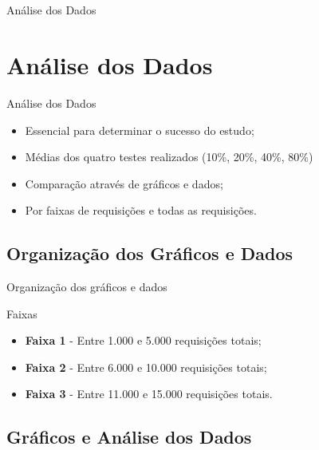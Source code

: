 \section*{}
\begin{frame}
	\centering
	{\Huge Análise dos Dados}
\end{frame}

\section{Análise dos Dados}\label{sec:analise-dos-dados}

\begin{frame}{Análise dos Dados}
	\begin{block}{}
		\begin{itemize}
			\item Essencial para determinar o sucesso do estudo;
			\item Médias dos quatro testes realizados (10\%, 20\%, 40\%, 80\%)
			\item Comparação através de gráficos e dados;
			\item Por faixas de requisições e todas as requisições.
		\end{itemize}
	\end{block}
\end{frame}

\subsection*{Organização dos Gráficos e Dados}

\begin{frame}{Organização dos gráficos e dados}
	\begin{block}{Faixas}
		\begin{itemize}
			\item \textbf{Faixa 1} - Entre 1.000 e 5.000 requisições totais;
			\item \textbf{Faixa 2} - Entre 6.000 e 10.000 requisições totais;
			\item \textbf{Faixa 3} - Entre 11.000 e 15.000 requisições totais.
		\end{itemize}
	\end{block}
\end{frame}

\subsection*{Gráficos e Análise dos Dados}

